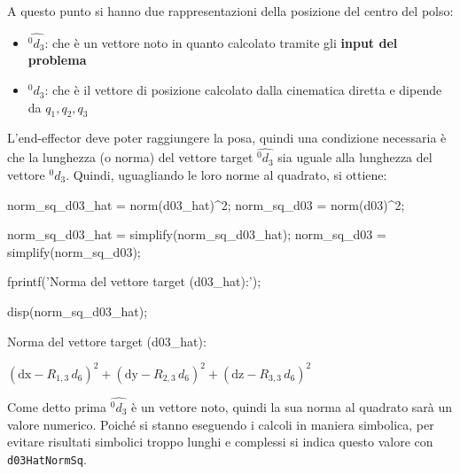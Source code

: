 \documentclass[11pt, a4paper]{article}
\begin{document}
\begin{par}
\begin{flushleft}
A questo punto si hanno due rappresentazioni della posizione del centro del polso:
\end{flushleft}
\end{par}

\begin{itemize}

   \item{\begin{flushleft} $\hat{^0 d_3 }$: che è un vettore noto in quanto calcolato tramite gli \textbf{input del problema} \end{flushleft}}
   \item{\begin{flushleft} $^0 d_3$: che è il vettore di posizione calcolato dalla cinematica diretta e dipende da $q_1, q_2, q_3$ \end{flushleft}}
\end{itemize}

\begin{par}
\begin{flushleft}
L'end-effector deve poter raggiungere la posa, quindi una condizione necessaria è che la lunghezza (o norma) del vettore target $\hat{^0 d_3 }$ sia uguale alla lunghezza del vettore $^0 d_3$. Quindi, uguagliando le loro norme al quadrato, si ottiene:
\end{flushleft}
\end{par}

\begin{matlabcode}
norm_sq_d03_hat = norm(d03_hat)^2;
norm_sq_d03 = norm(d03)^2;

norm_sq_d03_hat = simplify(norm_sq_d03_hat);
norm_sq_d03 = simplify(norm_sq_d03);

fprintf('Norma del vettore target (d03_hat):');

disp(norm_sq_d03_hat);
\end{matlabcode}
\begin{matlaboutput}
Norma del vettore target (d03_hat):
\end{matlaboutput}
\begin{matlabsymbolicoutput}
$\displaystyle {{\left(\textrm{dx}-R_{1,3} \,d_6 \right)}}^2 +{{\left(\textrm{dy}-R_{2,3} \,d_6 \right)}}^2 +{{\left(\textrm{dz}-R_{3,3} \,d_6 \right)}}^2 $
\end{matlabsymbolicoutput}

\begin{par}
\begin{flushleft}
Come detto prima $\hat{^0 d_3 }$ è un vettore noto, quindi la sua norma al quadrato sarà un valore numerico. Poiché si stanno eseguendo i calcoli in maniera simbolica, per evitare risultati simbolici troppo lunghi e complessi si indica questo valore con \texttt{d03HatNormSq}.
\end{flushleft}
\end{par}
\end{document}
